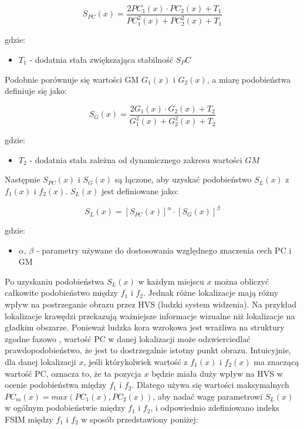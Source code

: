 \documentclass{article}
\begin{document}
\begin{equation}
S_{PC}(x) = \frac{2PC_1(x) \cdot PC_2(x) + T_1}{PC^2_1(x) + PC^2_2(x) + T_1}
\end{equation}

gdzie:
\begin{itemize}[label=]
    \item $T_1$ - dodatnia stała zwiększająca stabilność $S_PC$
\end{itemize}

Podobnie porównuje się wartości GM $G_1(x)$ i $G_2(x)$, a miarę podobieństwa definiuje się jako:

\begin{equation}
S_G(x) = \frac{2G_1(x) \cdot G_2(x) + T_2}{G^2_1(x) + G^2_2(x) + T_2}
\end{equation}

gdzie:
\begin{itemize}[label=]
    \item $T_2$ - dodatnia stała zależna od dynamicznego zakresu wartości $GM$
\end{itemize}

Następnie $S_{PC}(x)$ i $S_G(x)$ są łączone, aby uzyskać podobieństwo $S_L(x)$ z $f_1(x)$ i $f_2(x)$. $S_L(x)$ jest definiowane jako:

\begin{equation}
S_L(x) = [S_{PC}(x)]^\alpha \cdot [S_G(x)]^\beta
\end{equation}

gdzie:
\begin{itemize}[label=]
    \item $\alpha$, $\beta$ - parametry używane do dostosowania względnego znaczenia cech PC i GM
\end{itemize}

Po uzyskaniu podobieństwa $S_L(x)$ w każdym miejscu $x$ można obliczyć całkowite podobieństwo między $f_1$ i $f_2$. 
Jednak różne lokalizacje mają różny wpływ na postrzeganie obrazu przez HVS (ludzki system widzenia). 
Na przykład lokalizacje krawędzi przekazują ważniejsze informacje wizualne niż lokalizacje na gładkim obszarze. 
Ponieważ ludzka kora wzrokowa jest wrażliwa na struktury zgodne fazowo \cite{kora_wzrokowa}, wartość PC w danej 
lokalizacji może odzwierciedlać prawdopodobieństwo, że jest to dostrzegalnie istotny punkt obrazu. 
Intuicyjnie, dla danej lokalizacji $x$, jeśli którykolwiek wartość z $f_1(x)$ i $f_2(x)$ ma znaczącą wartość PC, 
oznacza to, że ta pozycja $x$ będzie miała duży wpływ na HVS w ocenie podobieństwa między $f_1$ i $f_2$. 
Dlatego używa się wartości maksymalnych $PC_m(x) = max (PC_1(x), PC_2(x))$, aby nadać wagę parametrowi $S_L(x)$ w 
ogólnym podobieństwie między $f_1$ i $f_2$, i odpowiednio zdefiniowano indeks FSIM między $f_1$ i $f_2$ w sposób przedstawiony poniżej:
\end{document}

